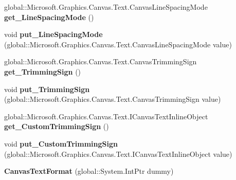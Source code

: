 \begin{DoxyCompactItemize}
global\+::\+Microsoft.\+Graphics.\+Canvas.\+Text.\+Canvas\+Line\+Spacing\+Mode {\bfseries get\+\_\+\+Line\+Spacing\+Mode} ()
\item 
\mbox{\label{class_microsoft_1_1_graphics_1_1_canvas_1_1_text_1_1_canvas_text_format_a886014158def86d2f1cff0ef5008817f}} 
void {\bfseries put\+\_\+\+Line\+Spacing\+Mode} (global\+::\+Microsoft.\+Graphics.\+Canvas.\+Text.\+Canvas\+Line\+Spacing\+Mode value)
\item 
\mbox{\label{class_microsoft_1_1_graphics_1_1_canvas_1_1_text_1_1_canvas_text_format_ad94de231bbaf0d4dc6bb416b81343159}} 
global\+::\+Microsoft.\+Graphics.\+Canvas.\+Text.\+Canvas\+Trimming\+Sign {\bfseries get\+\_\+\+Trimming\+Sign} ()
\item 
\mbox{\label{class_microsoft_1_1_graphics_1_1_canvas_1_1_text_1_1_canvas_text_format_a8066e8fae4c8e5707dfa8324ea7faf5b}} 
void {\bfseries put\+\_\+\+Trimming\+Sign} (global\+::\+Microsoft.\+Graphics.\+Canvas.\+Text.\+Canvas\+Trimming\+Sign value)
\item 
\mbox{\label{class_microsoft_1_1_graphics_1_1_canvas_1_1_text_1_1_canvas_text_format_a50e09efee298194e2e557308c2a13012}} 
global\+::\+Microsoft.\+Graphics.\+Canvas.\+Text.\+I\+Canvas\+Text\+Inline\+Object {\bfseries get\+\_\+\+Custom\+Trimming\+Sign} ()
\item 
\mbox{\label{class_microsoft_1_1_graphics_1_1_canvas_1_1_text_1_1_canvas_text_format_a28ea164db75b0d1e4f012001370dc6f8}} 
void {\bfseries put\+\_\+\+Custom\+Trimming\+Sign} (global\+::\+Microsoft.\+Graphics.\+Canvas.\+Text.\+I\+Canvas\+Text\+Inline\+Object value)
\item 
\mbox{\label{class_microsoft_1_1_graphics_1_1_canvas_1_1_text_1_1_canvas_text_format_a8cbafb823def969fc2ed24c98d5016f7}} 
{\bfseries Canvas\+Text\+Format} (global\+::\+System.\+Int\+Ptr dummy)
\item 

\end{DoxyCompactItemize}
